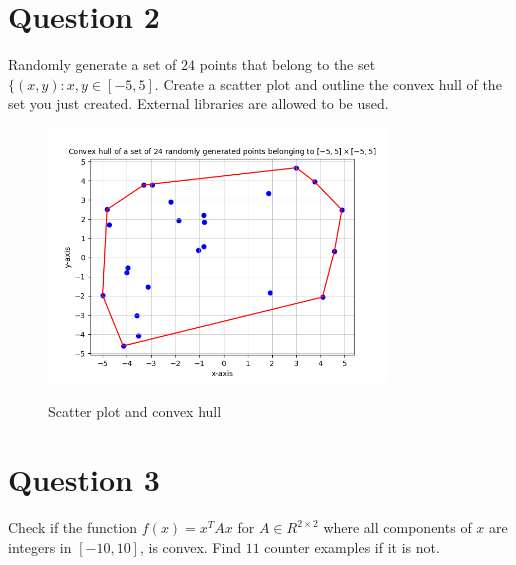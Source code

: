 \documentclass{article}
\begin{document}
\begin{flushleft}
\section{Question 2}
Randomly generate a set of $24$ points that belong to the set $\{(x,y):x,y\in[-5,5]$. Create a scatter plot and outline the convex hull of the set you just created. External libraries are allowed to be used.
\begin{figure}[htp]
        \centering
        \includegraphics[width=9cm]{conv_hull.png}\\
        \caption{Scatter plot and convex hull}
\end{figure}
\section{Question 3}
Check if the function $f(x)=x^{T}Ax$ for $A\in R^{2\times2}$ where all components of $x$ are integers in $[-10,10]$, is convex. Find $11$ counter examples if it is not.\\~\\


\end{flushleft}
\end{document}

